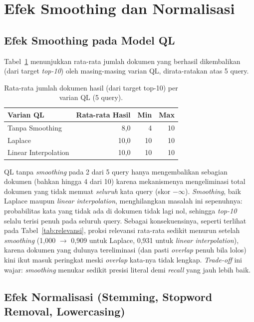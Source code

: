 \documentclass[10pt,a4paper]{article}
\begin{document}
\section{Efek Smoothing dan Normalisasi}

\subsection{Efek Smoothing pada Model QL}

Tabel~\ref{tab:smoothing} menunjukkan rata-rata jumlah dokumen yang berhasil dikembalikan (dari target \emph{top-10}) oleh masing-masing varian QL, dirata-ratakan atas 5 query.

\begin{table}[h]
    \centering
    \small
    \begin{tabular}{lrrr}
        \toprule
        \textbf{Varian QL} & \textbf{Rata-rata Hasil} & \textbf{Min} & \textbf{Max} \\
        \midrule
        Tanpa Smoothing      & 8,0  & 4  & 10 \\
        Laplace              & 10,0 & 10 & 10 \\
        Linear Interpolation & 10,0 & 10 & 10 \\
        \bottomrule
    \end{tabular}
    \caption{Rata-rata jumlah dokumen hasil (dari target top-10) per varian QL (5 query).}
    \label{tab:smoothing}
\end{table}

QL tanpa \emph{smoothing} pada 2 dari 5 query hanya mengembalikan sebagian dokumen (bahkan hingga 4 dari 10) karena mekanismenya mengeliminasi total dokumen yang tidak memuat \emph{seluruh} kata query (skor $-\infty$). \emph{Smoothing}, baik Laplace maupun \emph{linear interpolation}, menghilangkan masalah ini sepenuhnya: probabilitas kata yang tidak ada di dokumen tidak lagi nol, sehingga \emph{top-10} selalu terisi penuh pada seluruh query. Sebagai konsekuensinya, seperti terlihat pada Tabel~\ref{tab:relevansi}, proksi relevansi rata-rata sedikit menurun setelah \emph{smoothing} (1,000 $\rightarrow$ 0,909 untuk Laplace, 0,931 untuk \emph{linear interpolation}), karena dokumen yang dulunya tereliminasi (dan pasti \emph{overlap} penuh bila lolos) kini ikut masuk peringkat meski \emph{overlap} kata-nya tidak lengkap. \emph{Trade-off} ini wajar: \emph{smoothing} menukar sedikit presisi literal demi \emph{recall} yang jauh lebih baik.

\subsection{Efek Normalisasi (Stemming, Stopword Removal, Lowercasing)}
\end{document}
